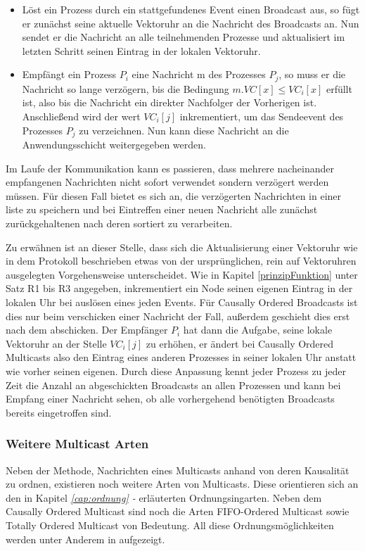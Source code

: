 \begin{itemize}
	\item Löst ein Prozess durch ein stattgefundenes Event einen Broadcast aus, so fügt er zunächst seine aktuelle Vektoruhr an die Nachricht des Broadcasts an. Nun sendet er die Nachricht an alle teilnehmenden Prozesse und aktualisiert im letzten Schritt seinen Eintrag in der lokalen Vektoruhr.
	\item Empfängt ein Prozess $P_i$ eine Nachricht m des Prozesses $P_j$, so muss er die Nachricht so lange verzögern, bis die Bedingung $m.VC[x] \le VC_i[x]$ erfüllt ist, also bis die Nachricht ein direkter Nachfolger der Vorherigen ist. Anschließend wird der wert $VC_i[j]$ inkrementiert, um das Sendeevent des Prozesses $P_j$ zu verzeichnen. Nun kann diese Nachricht an die Anwendungsschicht weitergegeben werden.
\end{itemize}

Im Laufe der Kommunikation kann es passieren, dass mehrere nacheinander empfangenen Nachrichten nicht sofort verwendet sondern verzögert werden müssen. Für diesen Fall bietet es sich an, die verzögerten Nachrichten in einer liste zu speichern und bei Eintreffen einer neuen Nachricht alle zunächst zurückgehaltenen nach deren  sortiert zu verarbeiten.

Zu erwähnen ist an dieser Stelle, dass sich die Aktualisierung einer Vektoruhr wie in dem Protokoll beschrieben etwas von der ursprünglichen, rein auf Vektoruhren ausgelegten Vorgehensweise unterscheidet. Wie in Kapitel \ref{prinzipFunktion} unter Satz R1 bis R3 angegeben, inkrementiert ein Node seinen eigenen Eintrag in der lokalen Uhr bei auslösen eines jeden Events. Für Causally Ordered Broadcasts ist dies nur beim verschicken einer Nachricht der Fall, außerdem geschieht dies erst nach dem abschicken. Der Empfänger $P_i$ hat dann die Aufgabe, seine lokale Vektoruhr an der Stelle $VC_i[j]$ zu erhöhen, er ändert bei Causally Ordered Multicasts also den Eintrag eines anderen Prozesses in seiner lokalen Uhr anstatt wie vorher seinen eigenen. Durch diese Anpassung kennt jeder Prozess zu jeder Zeit die Anzahl an abgeschickten Broadcasts an allen Prozessen und kann bei Empfang einer Nachricht sehen, ob alle vorhergehend benötigten Broadcasts bereits eingetroffen sind.
\subsubsection{Weitere Multicast Arten}
Neben der Methode, Nachrichten eines Multicasts anhand von deren Kausalität zu ordnen, existieren noch weitere Arten von Multicasts. Diese orientieren sich an den in Kapitel \textit{\ref{cap:ordnung} - } erläuterten Ordnungsingarten. Neben dem Causally Ordered Multicast sind noch die Arten FIFO-Ordered Multicast sowie Totally Ordered Multicast von Bedeutung. All diese Ordnungsmöglichkeiten werden unter Anderem in \cite{Tanenbaum2007} aufgezeigt.

